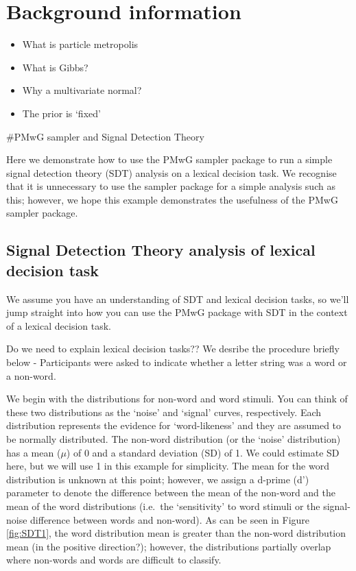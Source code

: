 \documentclass[]{book}
\providecommand{\tightlist}{%
  \setlength{\itemsep}{0pt}\setlength{\parskip}{0pt}}
\begin{document}
\hypertarget{background-information}{%
\section{Background information}\label{background-information}}

\begin{itemize}
\tightlist
\item
  What is particle metropolis
\item
  What is Gibbs?
\item
  Why a multivariate normal?
\item
  The prior is `fixed'
\end{itemize}

\#PMwG sampler and Signal Detection Theory

Here we demonstrate how to use the PMwG sampler package to run a simple signal detection theory (SDT) analysis on a lexical decision task. We recognise that it is unnecessary to use the sampler package for a simple analysis such as this; however, we hope this example demonstrates the usefulness of the PMwG sampler package.

\hypertarget{sdtOutline}{%
\subsection{Signal Detection Theory analysis of lexical decision task}\label{sdtOutline}}

We assume you have an understanding of SDT and lexical decision tasks, so we'll jump straight into how you can use the PMwG package with SDT in the context of a lexical decision task.

 Do we need to explain lexical decision tasks?? We desribe the procedure briefly below - Participants were asked to indicate whether a letter string was a word or a non-word.

We begin with the distributions for non-word and word stimuli. You can think of these two distributions as the `noise' and `signal' curves, respectively. Each distribution represents the evidence for `word-likeness' and they are assumed to be normally distributed. The non-word distribution (or the `noise' distribution) has a mean (\(\mu\)) of 0 and a standard deviation (SD) of 1. We could estimate SD here, but we will use 1 in this example for simplicity. The mean for the word distribution is unknown at this point; however, we assign a d-prime (d') parameter to denote the difference between the mean of the non-word and the mean of the word distributions (i.e.~the `sensitivity' to word stimuli or the signal-noise difference between words and non-word). As can be seen in Figure \ref{fig:SDT1}, the word distribution mean is greater than the non-word distribution mean (in the positive direction?); however, the distributions partially overlap where non-words and words are difficult to classify.
\end{document}
